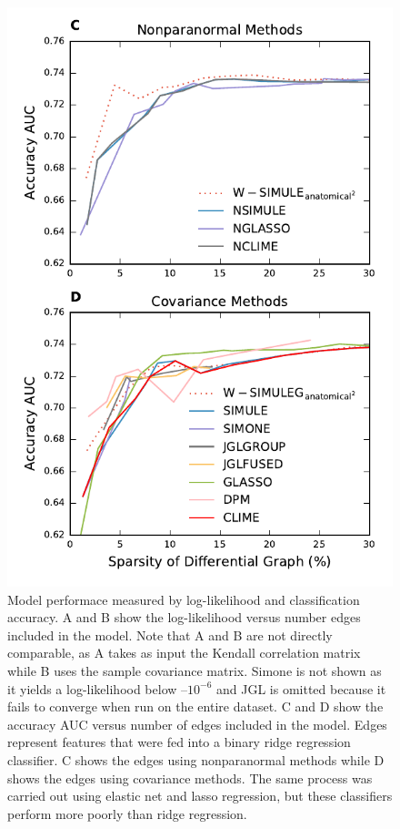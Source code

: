 \documentclass{article}
\begin{document}
\begin{figure}[ht!]
	\includegraphics[width=\columnwidth]{../../plots/acc/['full_1']_best_ridge_au_auc.pdf}
	\caption{Model performace measured by log-likelihood and classification accuracy. A and B show the log-likelihood versus number edges included in the model. Note that A and B are not directly comparable, as A takes as input the Kendall correlation matrix while B uses the sample covariance matrix. Simone is not shown as it yields a log-likelihood below --$10^{-6}$ and JGL is omitted because it fails to converge when run on the entire dataset. C and D show the accuracy AUC versus number of edges included in the model. Edges represent features that were fed into a binary ridge regression classifier. C shows the edges using nonparanormal methods while D shows the edges using covariance methods. The same process was carried out using elastic net and lasso regression, but these classifiers perform more poorly than ridge regression.}
	\label{fig:performance}
\end{figure}
\end{document}
